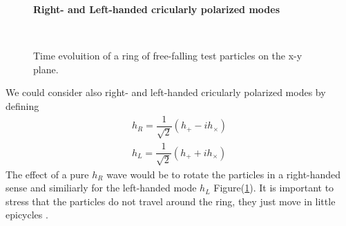 \begin{figure}[H]
\centering
    \textbf{ Right- and Left-handed cricularly polarized modes}\par\medskip
\centering

 \quad
{} \\
\caption{Time evoluition of a ring of free-falling test particles on the x-y plane.}
\label{left_and_right}
\end{figure}
We could consider also right- and left-handed cricularly polarized modes by defining
\begin{eqnarray}
\label{r_polarized}
h_{R} = \dfrac{1}{\sqrt{2}} (h_{+} - i h_{\times})
\\
\label{l_polarized}
h_{L} = \dfrac{1}{\sqrt{2}} (h_{+} + i h_{\times})
\end{eqnarray}
The effect of a pure $h_R$ wave would be to rotate the particles in a right-handed sense and similiarly for the left-handed mode $h_{L}$ Figure(\ref{left_and_right}). 
It is important to stress that the particles do not travel around the ring, they just move in little epicycles \cite{carroll_spacetime_2003}.\\
